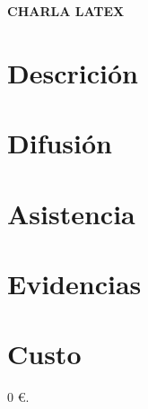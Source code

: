 \documentclass[a4paper,12pt]{article}
\newcommand{\activityName}{Charla LaTeX}
\newcommand{\subject}{\MakeUppercase{\activityName}}
\begin{document}
\begin{center}
    \large \textbf{\subject}
\end{center}


\section{Descrición}

\section{Difusión}

\section{Asistencia}

\section{Evidencias}

\section{Custo}

0 \euro.

\firma
\end{document}
